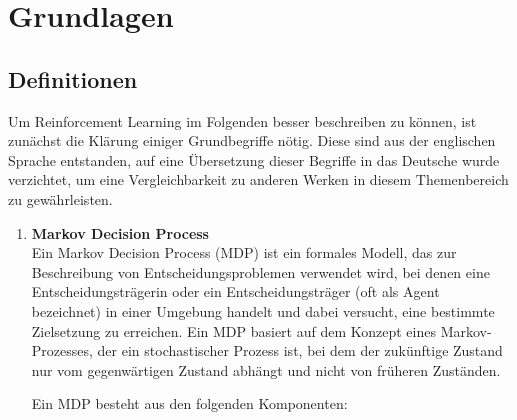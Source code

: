 \section{Grundlagen}


\subsection{Definitionen} \label{Definitionen}
Um Reinforcement Learning im Folgenden besser beschreiben zu können, ist zunächst die Klärung einiger Grundbegriffe nötig. Diese sind aus der englischen Sprache entstanden, auf eine Übersetzung dieser Begriffe in das Deutsche wurde verzichtet, um eine Vergleichbarkeit zu anderen Werken in diesem Themenbereich zu gewährleisten.

\begin{enumerate}
    \item \textbf{Markov Decision Process}\\
    Ein Markov Decision Process (MDP) ist ein formales Modell, das zur Beschreibung von Entscheidungsproblemen verwendet wird, bei denen eine Entscheidungsträgerin oder ein Entscheidungsträger (oft als Agent bezeichnet) in einer Umgebung handelt und dabei versucht, eine bestimmte Zielsetzung zu erreichen. Ein MDP basiert auf dem Konzept eines Markov-Prozesses, der ein stochastischer Prozess ist, bei dem der zukünftige Zustand nur vom gegenwärtigen Zustand abhängt und nicht von früheren Zuständen.

    Ein MDP besteht aus den folgenden Komponenten:


\end{enumerate}

